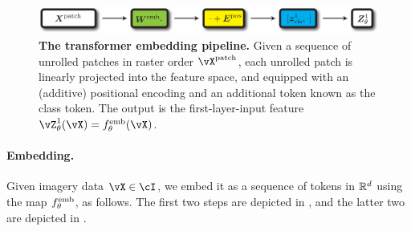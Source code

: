 \documentclass[../../book-main.tex]{subfiles}
\begin{document}
\begin{figure}
    \centering 
    \includegraphics[width=\textwidth]{figs_chap7/transformer_embedding.pdf}
    \caption{\small\textbf{The transformer embedding pipeline.} Given a sequence of unrolled patches in raster order \(\vX^{\patch}\), each unrolled patch is linearly projected into the feature space, and equipped with an (additive) positional encoding and an additional token known as the class token. The output is the first-layer-input feature \(\vZ_{\theta}^{1}(\vX) = f_{\theta}^{\emb}(\vX)\).}
    \label{fig:transformer_embedding}
\end{figure}

\paragraph{Embedding.} Given imagery data \(\vX \in \cI\), we embed it as a sequence of tokens in \(\mathbb{R}^{d}\) using the map \(f_{\theta}^{\mathrm{emb}}\), as follows. The first two steps are depicted in , and the latter two are depicted in .
\end{document}
